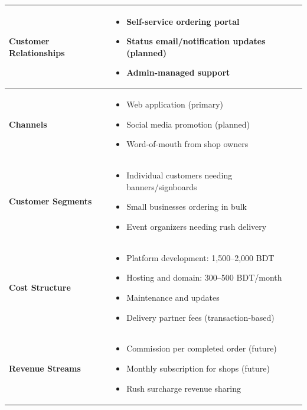 \documentclass[12pt,a4paper]{report}
\begin{document}
\begin{table}[H]
\begin{tabularx}{\textwidth}{L{3.2cm} X}
    \midrule
    \textbf{Customer Relationships}
      & \begin{itemize}[noitemsep,topsep=0pt,leftmargin=*]
          \item Self-service ordering portal
          \item Status email/notification updates (planned)
          \item Admin-managed support
        \end{itemize} \\
    \midrule
    \textbf{Channels}
      & \begin{itemize}[noitemsep,topsep=0pt,leftmargin=*]
          \item Web application (primary)
          \item Social media promotion (planned)
          \item Word-of-mouth from shop owners
        \end{itemize} \\
    \midrule
    \textbf{Customer Segments}
      & \begin{itemize}[noitemsep,topsep=0pt,leftmargin=*]
          \item Individual customers needing banners/signboards
          \item Small businesses ordering in bulk
          \item Event organizers needing rush delivery
        \end{itemize} \\
    \midrule
    \textbf{Cost Structure}
      & \begin{itemize}[noitemsep,topsep=0pt,leftmargin=*]
          \item Platform development: 1,500--2,000 BDT
          \item Hosting and domain: 300--500 BDT/month
          \item Maintenance and updates
          \item Delivery partner fees (transaction-based)
        \end{itemize} \\
    \midrule
    \textbf{Revenue Streams}
      & \begin{itemize}[noitemsep,topsep=0pt,leftmargin=*]
          \item Commission per completed order (future)
          \item Monthly subscription for shops (future)
          \item Rush surcharge revenue sharing
        \end{itemize} \\
    \bottomrule
  \end{tabularx}
\end{table}
\end{document}
